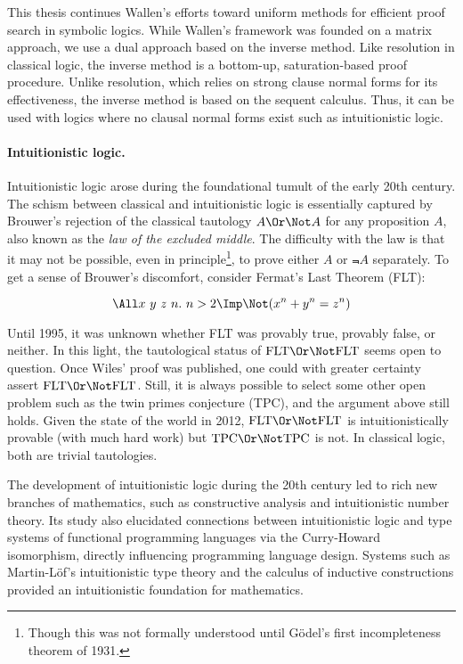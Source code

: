 This thesis continues Wallen's efforts toward uniform methods for
efficient proof search in symbolic logics.  While Wallen's framework
was founded on a matrix approach, we use a dual approach based on the
inverse method.  Like resolution in classical
logic, the inverse method is a bottom-up, saturation-based proof procedure.
Unlike resolution, which relies on strong clause normal forms for its
effectiveness, the inverse method is based on the sequent calculus.
Thus, it can be used with logics where no clausal normal forms exist such as
intuitionistic logic.


\paragraph{Intuitionistic logic.}

Intuitionistic logic arose during the foundational tumult of the early 20th
century.  The schism between classical and intuitionistic logic
is essentially captured by Brouwer's rejection of
the classical tautology $A \Or \Not A$ for any proposition $A$, also known as
the \emph{law of the excluded middle}.  The difficulty with the law is that it
may not be possible, even in principle\footnote{Though this was not formally
understood until G\"odel's first incompleteness theorem of 1931.}, to prove
either $A$ or $\Not A$ separately.  To get a sense of Brouwer's discomfort,
consider Fermat's Last Theorem (FLT):

\[
\All x\ y\ z\ n.\ n > 2 \Imp \Not (x^n + y^n = z^n)
\]

\newcommand{\FLT}{\mbox{FLT}}
\newcommand{\TPC}{\mbox{TPC}}

\noindent
Until 1995, it was unknown whether FLT was provably true, provably
false, or neither.  In this light, the tautological status of
$\FLT \Or \Not \FLT$ seems open to question.
Once Wiles' proof was published, one could with greater certainty assert
$\FLT \Or \Not \FLT$.   Still, it is always possible to select some other
open problem such as the twin primes conjecture (TPC), and the argument
above still holds.
Given the state of the world in 2012,
$\FLT \Or \Not \FLT$ is intuitionistically provable (with much hard work)
but $\TPC \Or \Not \TPC$ is not.
In classical logic, both are trivial tautologies.

The development of intuitionistic logic during the 20th century led to rich new
branches of mathematics, such as constructive analysis and intuitionistic
number theory.  Its
study also elucidated connections between intuitionistic logic and type systems
of functional programming languages via the Curry-Howard isomorphism, directly
influencing programming language design.  Systems such as
Martin-L\"of's intuitionistic type theory and the calculus of inductive constructions
provided an intuitionistic foundation for mathematics.

